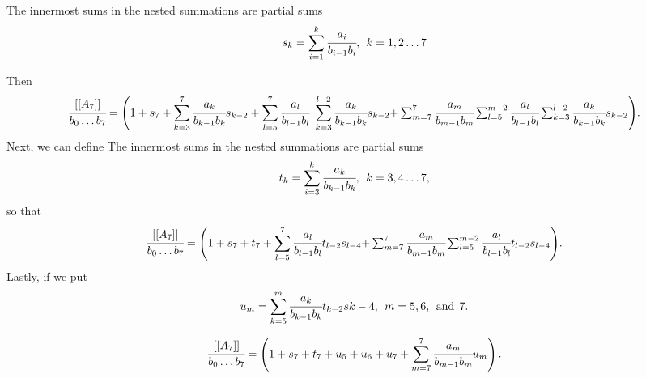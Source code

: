 \documentclass[16pt]{article}
\numberwithin{equation}{section}
\numberwithin{figure}{section}
\numberwithin{figure}{section}
\numberwithin{equation}{section}
\begin{document}
The innermost sums in the nested summations are partial sums
\begin{equation}
s_k=\sum_{i=1}^k \cfrac{a_i}{b_{i-1} b_i}, \> \> k=1,2 \ldots 7
\end{equation}

Then
\begin{equation}
\cfrac{[[A_7]]}{b_0 \ldots b_7}
= \Bigg (
1+s_7
+\sum_{k=3}^{7} \cfrac{a_k}{b_{k-1} b_k} s_{k-2}
+\sum_{l=5}^7\cfrac{a_l}{b_{l-1} b_l} \
 \sum_{k=3}^{l-2} \cfrac{a_k}{b_{k-1} b_k}s_{k-2}
$$   $$
+\sum_{m=7}^7\cfrac{a_m}{b_{m-1} b_m}\sum_{l=5}^{m-2} \cfrac{a_l}{b_{l-1} b_l}
 \sum_{k=3}^{l-2} \cfrac{a_k}{b_{k-1} b_k} s_{k-2}
\Bigg ).
\end{equation}
Next, we can define
The innermost sums in the nested summations are partial sums
\begin{equation}
t_k=\sum_{i=3}^k \cfrac{a_k}{b_{k-1} b_k}, \> \> k=3,4 \ldots 7,
\end{equation}
so that
\begin{equation}
\cfrac{[[A_7]]}{b_0 \ldots b_7}
= \Bigg (
1+s_7
+t_7
+\sum_{l=5}^7\cfrac{a_l}{b_{l-1} b_l} 
 t_{l-2} s_{l-4}
$$   $$
+\sum_{m=7}^7\cfrac{a_m}{b_{m-1} b_m}\sum_{l=5}^{m-2} \cfrac{a_l}{b_{l-1} b_l}
 t_{l-2} s_{l-4}
\Bigg ).
\end{equation}
Lastly, if we put
\begin{equation}
u_m=\sum_{k=5}^m \cfrac{a_k}{b_{k-1} b_k} t_{k-2} s{k-4}, \> \> m=5,6, \> \> {\rm and } \> \>7.
\end{equation}

\begin{equation}
\cfrac{[[A_7]]}{b_0 \ldots b_7}
= \left  (
1+s_7+t_7+u_5+u_6+u_7
+\sum_{m=7}^7\cfrac{a_m}{b_{m-1} b_m} u_m
\right ).
\end{equation}
\end{document}
